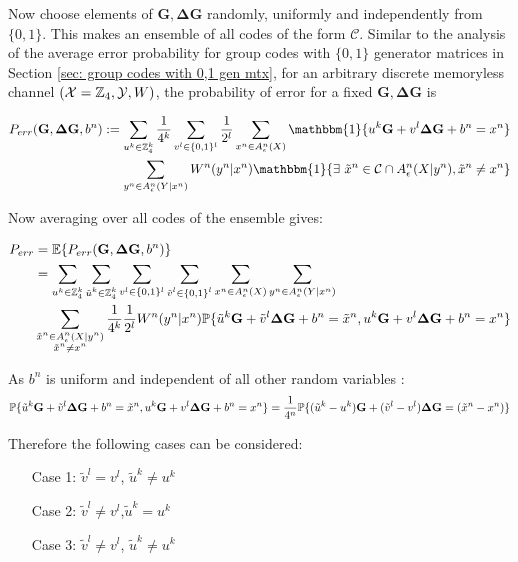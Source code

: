 Now choose elements of $\mathbf{G}, \mathbf{\Delta G}$ randomly, uniformly and independently from  $\{ 0,1\}$. This makes an ensemble of all codes of the form $\mathcal{C}$. Similar to the analysis of the average error probability for group codes with $\{ 0,1\}$ generator matrices in Section \ref{sec: group codes with 0,1 gen mtx}, for an arbitrary discrete memoryless channel $(\mathcal{X}=\mathbb{Z}_4, \mathcal{Y}, W)$, the probability of error for a fixed $\mathbf{G}, \mathbf{\Delta G}$ is



\begin{align*}
P_{err}(\mathbf{G},\mathbf{\Delta G},b^n):=\sum_{u^k\in \ZZ_4^k}\frac{1}{4^k} \sum_{v^l\in \{0,1 \}^l} \frac{1}{2^l} \sum_{x^n\in A_\epsilon^n(X)} \mathbbm{1}\{ u^k \mathbf{G}+v^l\mathbf{\Delta G}+b^n=x^n\}\\
 \sum_{y^n\in A_\epsilon^n(Y|x^n)}  W^n(y^n|x^n) \mathbbm{1}\{ \exists ~ \tilde{x}^n\in \mathcal{C} \cap A_\epsilon^n(X|y^n), \tilde{x}^n\neq x^n \}
\end{align*}

Now averaging over all codes of the ensemble gives:

\begin{align}\nonumber \label{equ: p_err_trans}
P_{err}&=\mathbb{E}\{ P_{err}(\mathbf{G},\mathbf{\Delta G},b^n) \}\\\nonumber
&=\sum_{u^k\in \mathbb{Z}_4^k} \sum_{\substack{\tilde{u}^k \in \mathbb{Z}_4^k }} \sum_{v^l\in \{0,1\}^l} \sum_{\substack{\tilde{v}^l \in \{0, 1\}^l}}  \sum_{x^n\in A_\epsilon^n(X)} \sum_{y^n\in A_\epsilon^n(Y|x^n)}\\
& \sum_{\substack{\tilde{x}^n\in A_\epsilon^n(X|y^n)\\
 \tilde{x}^n\neq x^n}} \frac{1}{4^k} \frac{1}{2^l} W^n(y^n|x^n) \mathbb{P}\{ \tilde{u}^k\mathbf{G}+\tilde{v}^l\mathbf{\Delta G}+b^n=\tilde{x}^n, u^k \mathbf{G}+v^l\mathbf{\Delta G}+b^n=x^n\} 
\end{align} 
 
 
As $b^n$ is uniform and  independent of all other random variables :
$$
\mathbb{P}\{ \tilde{u}^k\mathbf{G}+\tilde{v}^l\mathbf{\Delta G}+b^n=\tilde{x}^n, u^k \mathbf{G}+v^l\mathbf{\Delta G}+b^n=x^n\} = \frac{1}{4^n}\mathbb{P}\{ (\tilde{u}^k-u^k)\mathbf{G}+(\tilde{v}^l-v^l)\mathbf{\Delta G}=(\tilde{x}^n-x^n)\}
$$


Therefore the following cases can be considered:

\begin{enumerate}
\item[Case 1:] $\tilde{v}^l=v^l$, $\tilde{u}^k\neq u^k$
\item[Case 2:] $\tilde{v}^l \neq v^l$,$\tilde{u}^k=u^k$
\item[Case 3:] $\tilde{v}^l\neq v^l$, $\tilde{u}^k\neq u^k$  
\end{enumerate}


